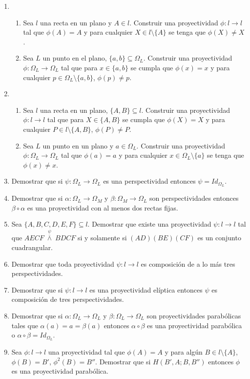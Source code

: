 \documentclass[12pt]{report}
\numberwithin{section}{chapter}
\begin{document}
\begin{enumerate}
\item 
\begin{enumerate}
\item Sea $l$ una recta en un plano y $A \in l$. Construir una proyectividad $\phi:l \to l$ tal que $\phi(A)=A$ y para cualquier $X \in l\setminus\{A\}$ se tenga que $\phi(X) \neq X$.
\item Sea $L$ un punto en el plano, $\{a,b\} \subseteq \Omega_L$. Construir una proyectividad $\phi:\Omega_L \to \Omega_L$ tal que para $x \in \{a,b\}$ se cumpla que $\phi(x)=x$ y para cualquier $p \in \Omega_L \setminus\{a,b\}$, $\phi(p) \neq p$.
\end{enumerate}

\item 
\begin{enumerate}
\item Sea $l$ una recta en un plano, $\{A,B\} \subseteq l$. Construir una proyectividad $\phi:l \to l$ tal que para $X \in \{A,B\}$ se cumpla que $\phi(X)=X$ y para cualquier $P \in l \setminus\{A,B\}$, $\phi(P) \neq P$.
\item Sea $L$ un punto en un plano y $a \in \Omega_L$. Construir una proyectividad $\phi:\Omega_L\to \Omega_L$ tal que $\phi(a)=a$ y para cualquier $x \in \Omega_L\setminus\{a\}$ se tenga que $\phi(x) \neq x$.
\end{enumerate}

\item Demostrar que si $\psi: \Omega_L \to \Omega_L$ es una perspectividad entonces $\psi= Id_{\Omega_L}$. 

\item Demostrar que si $\alpha: \Omega_L \to \Omega_M$ y $\beta: \Omega_M \to \Omega_L$ son perspectividades entonces $\beta \circ \alpha$ es una proyectividad con al menos dos rectas fijas.

\item Sea $\{A,B,C,D,E,F\} \subseteq l$. Demostrar que existe una proyectividad $\psi:l \to l$ tal que \linebreak $AECF\;\overset{\psi}{\overline{\wedge}}\; BDCF$ si y solamente si $(AD)(BE)(CF)$ es un conjunto cuadrangular.

\item Demostrar que toda proyectividad $\psi:l \to l$ es composición de a lo más tres perspectividades.

\item Demostrar que si $\psi:l \to l$ es una proyectividad elíptica entonces $\psi$ es composición de tres perspectividades.

\item Demostrar que si $\alpha: \Omega_L \to \Omega_L$ y $\beta:\Omega_L \to \Omega_L$ son  proyectividades parabólicas tales que $\alpha(a)=a=\beta(a)$ entonces $\alpha \circ \beta$ es una proyectividad parabólica o $\alpha \circ \beta = Id_{\Omega_L}$.

\item Sea $\phi:l \to l$ una proyectividad tal que $\phi(A)=A$ y para algún $B \in l\setminus\{A\}$, $\phi(B)=B'$, $\phi^2(B)=B''$. Demostrar que si $H(B',A;B,B'')$ entonces $\phi$ es una proyectividad parabólica.

\end{enumerate}
\end{document}
